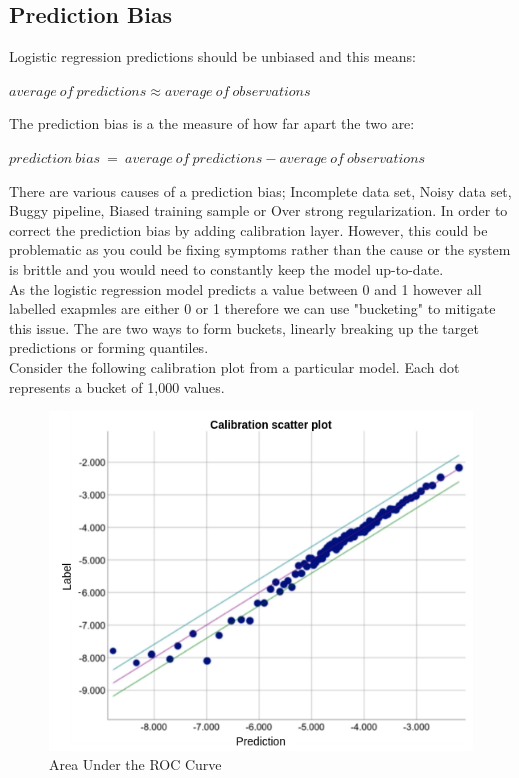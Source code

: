 \documentclass[12pt]{article}
\begin{document}
\subsection{Prediction Bias}
Logistic regression predictions should be unbiased and this means:
\begin{center}
$average\ of\ predictions \approx average\ of\ observations$
\end{center}
The prediction bias is a the measure of how far apart the two are:
\begin{center}
$prediction\ bias\ =\ average\ of\ predictions - average\ of\ observations$
\end{center}

There are various causes of a prediction bias; Incomplete data set, Noisy data set, Buggy pipeline, Biased training sample or Over strong regularization. In order to correct the prediction bias by adding calibration layer. However, this could be problematic as you could be fixing symptoms rather than the cause or the system is brittle and you would need to constantly keep the model up-to-date.
\\
As the logistic regression model predicts a value between 0 and 1 however all labelled exapmles are either 0 or 1 therefore we can use "bucketing" to mitigate this issue. The are two ways to form buckets, linearly breaking up the target predictions or forming quantiles.\\ Consider the following calibration plot from a particular model. Each dot represents a bucket of 1,000 values. 
\begin{figure}[H]
	\includegraphics[scale = 0.3]{imgs/CalibrationScatter.png}
	\centering
	\caption{Area Under the ROC Curve}
\end{figure}
\end{document}
